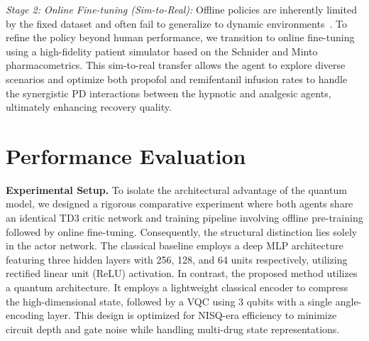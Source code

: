 \documentclass[pdflatex,sn-mathphys-num]{sn-jnl}%
\newcommand{\BfPara}[1]{{\noindent\bf#1.}\xspace}
\theoremstyle{thmstyleone}%
\theoremstyle{thmstyletwo}%
\theoremstyle{thmstylethree}%
\begin{document}
\noindent\textit{Stage 2: Online Fine-tuning (Sim-to-Real):}
Offline policies are inherently limited by the fixed dataset and often fail to generalize to dynamic environments~\citep{xia_22_off}. To refine the policy beyond human performance, we transition to online fine-tuning using a high-fidelity patient simulator based on the Schnider and Minto pharmacometrics. This sim-to-real transfer allows the agent to explore diverse scenarios and optimize both propofol and remifentanil infusion rates to handle the synergistic PD interactions between the hypnotic and analgesic agents, ultimately enhancing recovery quality.



\section{Performance Evaluation} \label{sec:5}

\BfPara{Experimental Setup}
To isolate the architectural advantage of the quantum model, we designed a rigorous comparative experiment where both agents share an identical TD3 critic network and training pipeline involving offline pre-training followed by online fine-tuning. Consequently, the structural distinction lies solely in the actor network. The classical baseline employs a deep MLP architecture featuring three hidden layers with 256, 128, and 64 units respectively, utilizing rectified linear unit (ReLU) activation. In contrast, the proposed method utilizes a quantum architecture. It employs a lightweight classical encoder to compress the high-dimensional state, followed by a VQC using 3 qubits with a single angle-encoding layer. This design is optimized for NISQ-era efficiency to minimize circuit depth and gate noise while handling multi-drug state representations.

\end{document}
